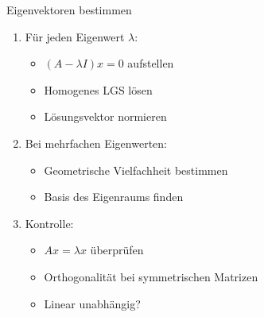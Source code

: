 \begin{KR}{Eigenvektoren bestimmen}
\begin{enumerate}
    \item Für jeden Eigenwert $\lambda$:
    \begin{itemize}
        \item $(A-\lambda I)x = 0$ aufstellen
        \item Homogenes LGS lösen
        \item Lösungsvektor normieren
    \end{itemize}
    
    \item Bei mehrfachen Eigenwerten:
    \begin{itemize}
        \item Geometrische Vielfachheit bestimmen
        \item Basis des Eigenraums finden
    \end{itemize}
    
    \item Kontrolle:
    \begin{itemize}
        \item $Ax = \lambda x$ überprüfen
        \item Orthogonalität bei symmetrischen Matrizen
        \item Linear unabhängig?
    \end{itemize}
\end{enumerate}
\end{KR}

